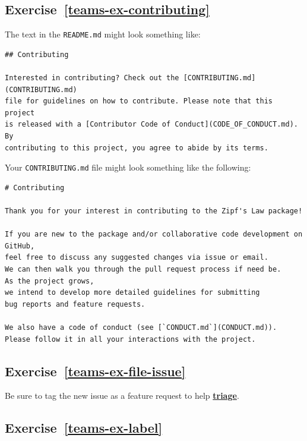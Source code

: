 \documentclass[
]{krantz}
\newcommand{\gref}[2]{\hyperlink{#2}{\textbf{#1}}}
\begin{document}
\hypertarget{exercise-refteams-ex-contributing}{%
\subsection*{Exercise~\ref{teams-ex-contributing}}\label{exercise-refteams-ex-contributing}}


The text in the \texttt{README.md} might look something like:

\begin{verbatim}
## Contributing

Interested in contributing? Check out the [CONTRIBUTING.md](CONTRIBUTING.md)
file for guidelines on how to contribute. Please note that this project
is released with a [Contributor Code of Conduct](CODE_OF_CONDUCT.md). By
contributing to this project, you agree to abide by its terms.
\end{verbatim}

Your \texttt{CONTRIBUTING.md} file might look something like the following:

\begin{verbatim}
# Contributing

Thank you for your interest in contributing to the Zipf's Law package!

If you are new to the package and/or collaborative code development on GitHub,
feel free to discuss any suggested changes via issue or email.
We can then walk you through the pull request process if need be.
As the project grows,
we intend to develop more detailed guidelines for submitting
bug reports and feature requests.

We also have a code of conduct (see [`CONDUCT.md`](CONDUCT.md)).
Please follow it in all your interactions with the project.
\end{verbatim}

\hypertarget{exercise-refteams-ex-file-issue}{%
\subsection*{Exercise~\ref{teams-ex-file-issue}}\label{exercise-refteams-ex-file-issue}}


Be sure to tag the new issue as a feature request to help \gref{triage}{triage}.

\hypertarget{exercise-refteams-ex-label}{%
\subsection*{Exercise~\ref{teams-ex-label}}\label{exercise-refteams-ex-label}}
\end{document}
